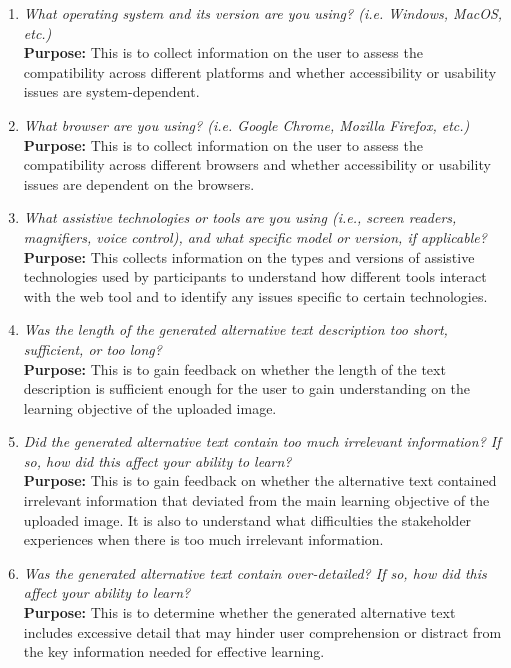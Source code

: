 \documentclass[12pt, titlepage]{article}
\begin{document}
\begin{enumerate}[label=UA-Q \arabic*., wide=0pt, leftmargin=*]
  \item \emph{What operating system and its version are you using?
    (i.e. Windows, MacOS, etc.)}\\[2mm]
    {\bf Purpose:} This is to collect information on the user to assess
    the compatibility across different platforms and
    whether accessibility or usability issues are system-dependent.

  \item \emph{What browser are you using? (i.e. Google Chrome, Mozilla
    Firefox, etc.)}\\[2mm]
    {\bf Purpose:} This is to collect information on the user to assess
    the compatibility across different browsers and
    whether accessibility or usability issues are dependent on the browsers.

  \item \emph{What assistive technologies or tools are you using (i.e.,
      screen readers, magnifiers, voice control), and what specific model
    or version, if applicable?}\\[2mm]
    {\bf Purpose:} This collects information on the types and versions
    of assistive technologies used by participants to understand how
    different tools interact with the web tool
    and to identify any issues specific to certain technologies.

  \item \emph{Was the length of the generated alternative text
    description too short, sufficient, or too long?}\\[2mm]
    {\bf Purpose:} This is to gain feedback on whether the length of
    the text description is sufficient enough
    for the user to gain understanding on the learning objective of the
    uploaded image.

  \item \emph{Did the generated alternative text contain too much
      irrelevant information? If so, how did this affect
    your ability to learn?}\\[2mm]
    {\bf Purpose:} This is to gain feedback on whether the alternative
    text contained irrelevant information that deviated
    from the main learning objective of the uploaded image. It is also
    to understand what difficulties the stakeholder experiences
    when there is too much irrelevant information.

  \item \emph{Was the generated alternative text contain over-detailed?
      If so, how did this affect
    your ability to learn?}\\[2mm]
    {\bf Purpose:} This is to determine whether the generated
    alternative text includes excessive detail that may hinder user
    comprehension or distract from the key information needed for
    effective learning.


\end{enumerate}
\end{document}
